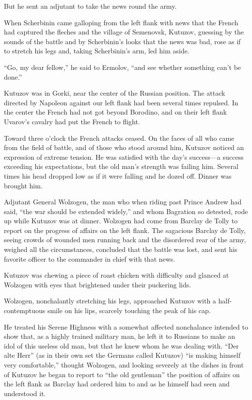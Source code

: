 But he sent an adjutant to take the news round the army.

When Scherbinin came galloping from the left flank with news that
the French had captured the fleches and the village of Semenovsk,
Kutuzov, guessing by the sounds of the battle and by Scherbinin's
looks that the news was bad, rose as if to stretch his legs and,
taking Scherbinin's arm, led him aside.

``Go, my dear fellow,'' he said to Ermolov, ``and see whether
something can't be done.''

Kutuzov was in Gorki, near the center of the Russian
position. The attack directed by Napoleon against our left flank
had been several times repulsed. In the center the French had not
got beyond Borodino, and on their left flank Uvarov's cavalry had
put the French to flight.

Toward three o'clock the French attacks ceased. On the faces of
all who came from the field of battle, and of those who stood
around him, Kutuzov noticed an expression of extreme tension. He
was satisfied with the day's success---a success exceeding his
expectations, but the old man's strength was failing him. Several
times his head dropped low as if it were falling and he dozed
off. Dinner was brought him.

Adjutant General Wolzogen, the man who when riding past Prince
Andrew had said, ``the war should be extended widely,'' and whom
Bagration so detested, rode up while Kutuzov was at
dinner. Wolzogen had come from Barclay de Tolly to report on the
progress of affairs on the left flank.  The sagacious Barclay de
Tolly, seeing crowds of wounded men running back and the
disordered rear of the army, weighed all the circumstances,
concluded that the battle was lost, and sent his favorite officer
to the commander in chief with that news.

Kutuzov was chewing a piece of roast chicken with difficulty and
glanced at Wolzogen with eyes that brightened under their
puckering lids.

Wolzogen, nonchalantly stretching his legs, approached Kutuzov
with a half-contemptuous smile on his lips, scarcely touching the
peak of his cap.

He treated his Serene Highness with a somewhat affected
nonchalance intended to show that, as a highly trained military
man, he left it to Russians to make an idol of this useless old
man, but that he knew whom he was dealing with. ``Der alte Herr''
(as in their own set the Germans called Kutuzov) ``is making
himself very comfortable,'' thought Wolzogen, and looking
severely at the dishes in front of Kutuzov he began to report to
``the old gentleman'' the position of affairs on the left flank
as Barclay had ordered him to and as he himself had seen and
understood it.

